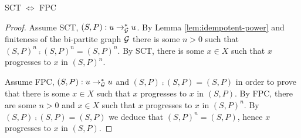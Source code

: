 \begin{proposition}
\label{proposition-SCT}
SCT $\Leftrightarrow$ FPC
\end{proposition}

\begin{proof}
Assume SCT, $(S,P) : u \to_{\mathcal{G}}^* u$.
By Lemma \ref{lem:idempotent-power} and finiteness of the bi-partite graph $\mathcal{G}$
there is some $n > 0$ such that $(S,P)^n \comp (S,P)^n=(S,P)^n$. By SCT,
there is some $x \in X$ such that $x$ progresses to $x$ in $(S,P)^n$.

Assume FPC, $(S,P) : u \to_{\mathcal{G}}^* u$ and 
$(S,P) \comp (S,P)=(S,P)$ in order to prove that 
there is some $x \in X$ such that $x$ progresses to $x$ in $(S,P)$.
By FPC, there are some $n > 0 $ and $x \in X$ such that $x$ progresses to $x$ in 
$(S,P)^n$. By $(S,P)\comp (S,P)=(S,P)$ we deduce that 
$(S,P)^n=(S,P)$, hence $x$ progresses to $x$ in $(S,P)$.
\end{proof}

\fi
